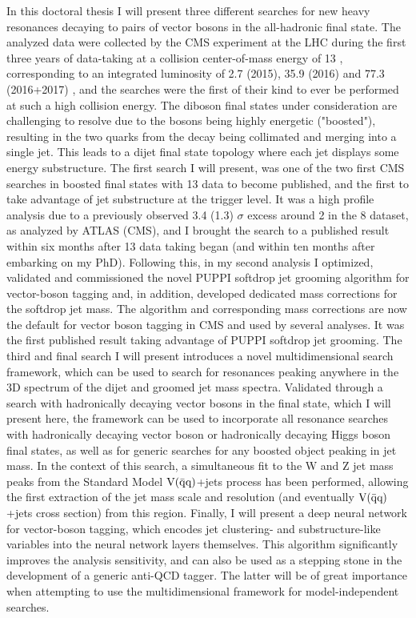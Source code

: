 \small
\noindent In this doctoral thesis I will present three different searches for new heavy resonances decaying to pairs of vector bosons in the all-hadronic final state. The analyzed data were collected by the CMS experiment at the LHC during the first three years of data-taking at a collision center-of-mass energy of 13 \TeV, corresponding to an integrated luminosity of 2.7 (2015), 35.9 (2016) and 77.3 (2016+2017) \fbinv, and the searches were the first of their kind to ever be performed at such a high collision energy. The diboson final states under consideration are challenging to resolve due to the bosons being highly energetic ("boosted"), resulting in the two quarks from the decay being collimated and merging into a single jet. This leads to a dijet final state topology where each jet displays some energy substructure. The first search I will present, was one of the two first CMS searches in boosted final states with 13 \TeV data to become published, and the first to take advantage of jet substructure at the trigger level. It was a high profile analysis due to a previously observed 3.4 (1.3) $\sigma$ excess around 2 \TeV in the 8 \TeV dataset, as analyzed by ATLAS (CMS), and I brought the search to a published result within six months after 13 \TeV data taking began (and within ten months after embarking on my PhD). Following this, in my second analysis I optimized, validated and commissioned the novel PUPPI softdrop jet grooming algorithm for vector-boson tagging and, in addition, developed dedicated mass corrections for the softdrop jet mass. The algorithm and corresponding mass corrections are now the default for vector boson tagging in CMS and used by several analyses. It was the first published result taking advantage of PUPPI softdrop jet grooming. The third and final search I will present introduces a novel multidimensional search framework, which can be used to search for resonances peaking anywhere in the 3D spectrum of the dijet and groomed jet mass spectra. Validated through a search with hadronically decaying vector bosons in the final state, which I will present here, the framework can be used to incorporate all resonance searches with hadronically decaying vector boson or hadronically decaying Higgs boson final states, as well as for generic searches for any boosted object peaking in jet mass. In the context of this search, a simultaneous fit to the W and Z jet mass peaks from the Standard Model $\mathrm{V}(\bar{\rm{q}}\rm{q})$+jets process has been performed, allowing the first extraction of the jet mass scale and resolution (and eventually $\mathrm{V}(\bar{\rm{q}}\rm{q})$+jets cross section) from this region. Finally, I will present a deep neural network for vector-boson tagging, which encodes jet clustering- and substructure-like variables into the neural network layers themselves. This algorithm significantly improves the analysis sensitivity, and can also be used as a stepping stone in the development of a generic anti-QCD tagger. The latter will be of great importance when attempting to use the multidimensional framework for model-independent searches.